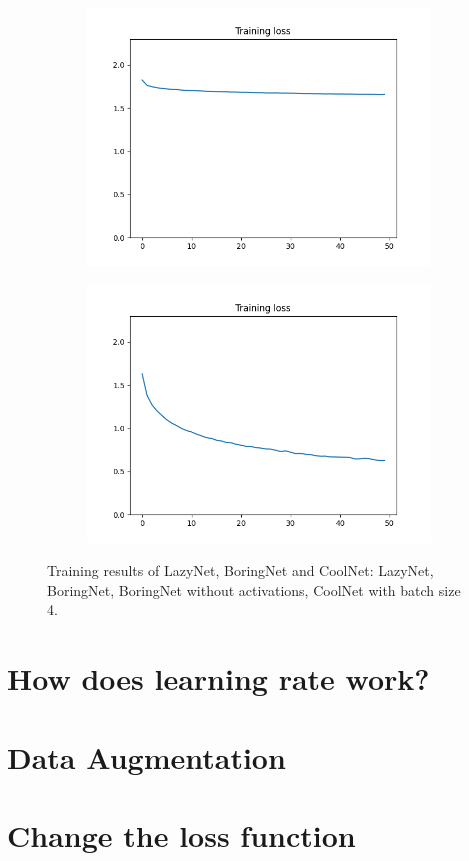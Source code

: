 \documentclass[12pt]{article}
\begin{document}
\begin{figure}
\begin{subfigure}{0.16\textwidth}
    \includegraphics[width=\linewidth]{loss_2_2_1.png}
    \caption{}
    \label{fig:2_2_1}
  \end{subfigure}
  \begin{subfigure}{0.16\textwidth}
    \centering
    \includegraphics[width=\linewidth]{loss_2_3_bs4.png}
    \caption{}
    \label{fig:2_3_bs4}
  \end{subfigure}
  \caption{Training results of LazyNet, BoringNet and CoolNet:  LazyNet,  BoringNet,  BoringNet without activations,  CoolNet with batch size 4.}
  \label{fig:images}
\end{figure}

\section{How does learning rate work?}

\section{Data Augmentation}

\section{Change the loss function}



\end{document}
